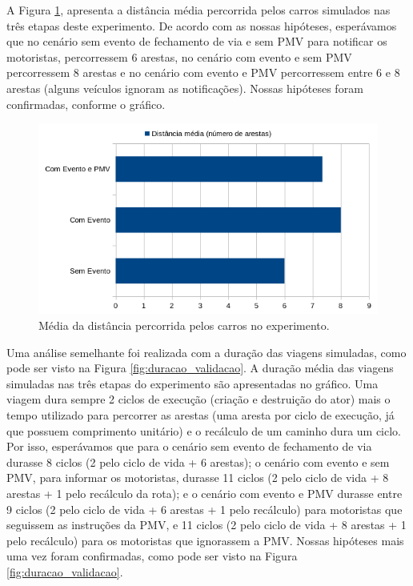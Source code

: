 A Figura \ref{fig:distancia_validacao}, apresenta a distância média percorrida pelos carros simulados nas três etapas deste experimento.
De acordo com as nossas hipóteses, esperávamos que no cenário sem evento de fechamento de via e sem PMV para notificar os motoristas, percorressem 6 arestas, no cenário com evento e sem PMV
percorressem 8 arestas e no cenário com evento e PMV percorressem entre 6 e 8 arestas (alguns veículos ignoram as notificações).
Nossas hipóteses foram confirmadas, conforme o gráfico.

\begin{figure}[ht]
	\centering
	\includegraphics[width=\textwidth]{figuras/distancia_validacao.png}
	\caption{Média da distância percorrida pelos carros no experimento.}
	\label{fig:distancia_validacao}
\end{figure}

Uma análise semelhante foi realizada com a duração das viagens simuladas, como pode ser visto na Figura \ref{fig:duracao_validacao}.
A duração média das viagens simuladas nas três etapas do experimento são apresentadas no gráfico.
Uma viagem dura sempre 2 ciclos de execução (criação e destruição do ator) mais o tempo utilizado para percorrer as arestas (uma aresta por ciclo de execução, já que possuem comprimento unitário)
e o recálculo de um caminho dura um ciclo.
Por isso, esperávamos que para o cenário sem evento de fechamento de via durasse 8 ciclos (2 pelo ciclo de vida + 6 arestas);
o cenário com evento e sem PMV, para informar os motoristas, durasse 11 ciclos (2 pelo ciclo de vida + 8 arestas + 1 pelo recálculo da rota);
e o cenário com evento e PMV durasse entre 9 ciclos (2 pelo ciclo de vida + 6 arestas + 1 pelo recálculo) para motoristas que seguissem as instruções da PMV, e 11 ciclos (2 pelo ciclo de vida + 8 arestas +
1 pelo recálculo) para os motoristas que ignorassem a PMV.
Nossas hipóteses mais uma vez foram confirmadas, como pode ser visto na Figura \ref{fig:duracao_validacao}.

